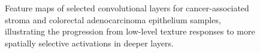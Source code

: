 \begin{figure}[htbp]
    \centering
    
    \caption{Feature maps of selected convolutional layers for cancer-associated
    stroma and colorectal adenocarcinoma epithelium samples, illustrating the
    progression from low-level texture responses to more spatially selective
    activations in deeper layers.}
    \label{fig:baseline224-feature-maps}
\end{figure}
